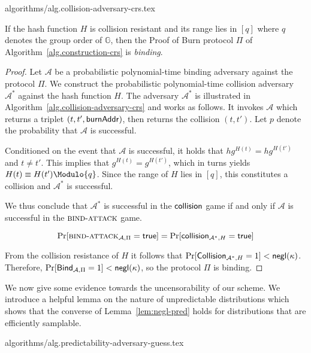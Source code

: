 {algorithms/alg.collision-adversary-crs.tex}

\begin{theorem}[Binding]
  If the hash function $H$ is collision resistant and its range lies in $[q]$ where $q$ denotes the group order of $\mathbb{G}$, then the Proof of Burn protocol $\Pi$ of Algorithm~\ref{alg.construction-crs} is \emph{binding}.
\end{theorem}
\begin{proof}
  Let $\mathcal{A}$ be a probabilistic polynomial-time binding adversary against the protocol $\Pi$. We construct the probabilistic polynomial-time collision adversary $\mathcal{A}^*$ against the hash function $H$. The adversary $\mathcal{A}^*$ is illustrated in Algorithm~\ref{alg.collision-adversary-crs} and works as follows. It invokes $\mathcal{A}$ which returns a triplet $(t, t', \mathsf{burnAddr})$, then returns the collision $(t, t')$. Let $p$ denote the probability that $\mathcal{A}$ is successful.

  Conditioned on the event that $\mathcal{A}$ is successful, it holds that
  $h g^{H(t)} = h g^{H(t')}$ and $t \neq t'$. This implies that $g^{H(t)} = g^{H(t')}$, which in turns yields $H(t) \equiv H(t') \Modulo{q}$. Since the range of $H$ lies in $[q]$, this constitutes a collision and $\mathcal{A}^*$ is successful.

  We thus conclude that $\mathcal{A^*}$ is successful in the $\textsf{collision}$ game if and only if $\mathcal{A}$ is successful in the $\textsc{bind}\-\text{-}\-\textsc{attack}$ game.

  \[
    \Pr[\textsc{bind}\-\text{-}\-\textsc{attack}_{\mathcal{A},\Pi} = \mathsf{true}]
    =
    \Pr[\textsf{collision}_{\mathcal{A}^*,H} = \mathsf{true}]
  \]

  From the collision resistance of $H$ it follows that $\Pr[\textsf{Collision}_{\mathcal{A}^*,H} = 1] < \textsf{negl}(\kappa)$. Therefore,
  $\Pr[\textsf{Bind}_{\mathcal{A},\Pi} = 1] < \textsf{negl}(\kappa)$, so
  the protocol $\Pi$ is binding.
\end{proof}

We now give some evidence towards the uncensorability of our scheme.
We introduce a helpful lemma on the nature of unpredictable
distributions which shows that the converse of Lemma~\ref{lem:negl-pred}
holds for distributions that are efficiently samplable.

{algorithms/alg.predictability-adversary-guess.tex}

